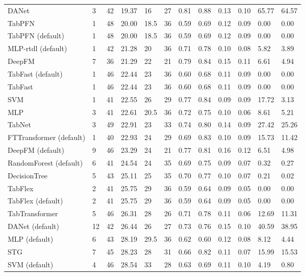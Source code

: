\begin{tabular}{lllllrllllll}
DANet & 3 & 42 & 19.37 & 16 & 27 & 0.81 & 0.88 & 0.13 & 0.10 & 65.77 & 64.57 \\
TabPFN & 1 & 48 & 20.00 & 18.5 & 36 & 0.59 & 0.69 & 0.12 & 0.09 & 0.00 & 0.00 \\
TabPFN (default) & 1 & 48 & 20.00 & 18.5 & 36 & 0.59 & 0.69 & 0.12 & 0.09 & 0.00 & 0.00 \\
MLP-rtdl (default) & 1 & 42 & 21.28 & 20 & 36 & 0.71 & 0.78 & 0.10 & 0.08 & 5.82 & 3.89 \\
DeepFM & 7 & 36 & 21.29 & 22 & 21 & 0.79 & 0.84 & 0.15 & 0.11 & 6.61 & 4.94 \\
TabFast (default) & 1 & 46 & 22.44 & 23 & 36 & 0.60 & 0.68 & 0.11 & 0.09 & 0.00 & 0.00 \\
TabFast & 1 & 46 & 22.44 & 23 & 36 & 0.60 & 0.68 & 0.11 & 0.09 & 0.00 & 0.00 \\
SVM & 1 & 41 & 22.55 & 26 & 29 & 0.77 & 0.84 & 0.09 & 0.09 & 17.72 & 3.13 \\
MLP & 3 & 41 & 22.61 & 20.5 & 36 & 0.72 & 0.75 & 0.10 & 0.06 & 8.61 & 5.21 \\
TabNet & 3 & 49 & 22.91 & 23 & 33 & 0.74 & 0.80 & 0.14 & 0.09 & 27.42 & 25.26 \\
FTTransformer (default) & 1 & 40 & 22.93 & 24 & 29 & 0.69 & 0.83 & 0.10 & 0.09 & 15.73 & 11.42 \\
DeepFM (default) & 9 & 46 & 23.29 & 24 & 21 & 0.77 & 0.81 & 0.16 & 0.12 & 6.51 & 4.98 \\
RandomForest (default) & 6 & 41 & 24.54 & 24 & 35 & 0.69 & 0.75 & 0.09 & 0.07 & 0.32 & 0.27 \\
DecisionTree & 5 & 43 & 25.11 & 25 & 35 & 0.70 & 0.77 & 0.10 & 0.07 & 0.21 & 0.02 \\
TabFlex & 2 & 41 & 25.75 & 29 & 36 & 0.59 & 0.64 & 0.09 & 0.05 & 0.00 & 0.00 \\
TabFlex (default) & 2 & 41 & 25.75 & 29 & 36 & 0.59 & 0.64 & 0.09 & 0.05 & 0.00 & 0.00 \\
TabTransformer & 5 & 46 & 26.31 & 28 & 26 & 0.71 & 0.78 & 0.11 & 0.06 & 12.69 & 11.31 \\
DANet (default) & 12 & 42 & 26.44 & 26 & 27 & 0.73 & 0.76 & 0.15 & 0.10 & 40.59 & 38.95 \\
MLP (default) & 6 & 43 & 28.19 & 29.5 & 36 & 0.62 & 0.60 & 0.12 & 0.08 & 8.12 & 4.44 \\
STG & 7 & 45 & 28.23 & 28 & 31 & 0.66 & 0.82 & 0.11 & 0.07 & 15.99 & 15.53 \\
SVM (default) & 4 & 46 & 28.54 & 33 & 28 & 0.63 & 0.69 & 0.11 & 0.10 & 4.19 & 0.80 \\

\end{tabular}
